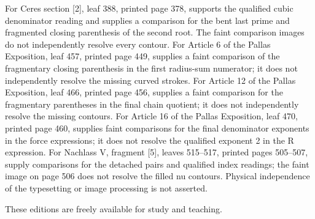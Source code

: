 For Ceres section [2], leaf 388, printed page 378, supports the qualified cubic denominator reading and supplies a comparison for the bent last prime and fragmented closing parenthesis of the second root. The faint comparison images do not independently resolve every contour. For Article 6 of the Pallas Exposition, leaf 457, printed page 449, supplies a faint comparison of the fragmentary closing parenthesis in the first radius-sum numerator; it does not independently resolve the missing curved strokes. For Article 12 of the Pallas Exposition, leaf 466, printed page 456, supplies a faint comparison for the fragmentary parentheses in the final chain quotient; it does not independently resolve the missing contours. For Article 16 of the Pallas Exposition, leaf 470, printed page 460, supplies faint comparisons for the final denominator exponents in the force expressions; it does not resolve the qualified exponent 2 in the R expression. For Nachlass V, fragment [5], leaves 515–517, printed pages 505–507, supply comparisons for the detached pairs and qualified index readings; the faint image on page 506 does not resolve the filled nu contours. Physical independence of the typesetting or image processing is not asserted.

These editions are freely available for study and teaching.

\par\clearpage\endgroup
